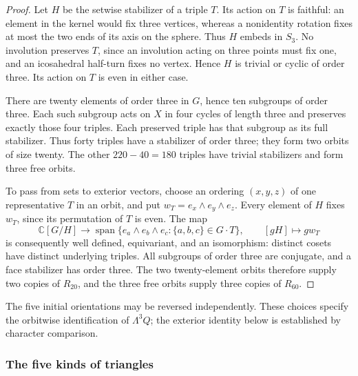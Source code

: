 \documentclass[11pt,a4paper]{article}
\begin{document}
\begin{proof}
Let $H$ be the setwise stabilizer of a triple $T$. Its action on $T$ is
faithful: an element in the kernel would fix three vertices, whereas
a nonidentity rotation fixes at most the two ends of its axis on the
sphere. Thus $H$ embeds in $S_3$. No involution preserves $T$, since
an involution acting on three points must fix one, and an icosahedral
half-turn fixes no vertex. Hence $H$ is trivial or cyclic of order
three. Its action on $T$ is even in either case.

There are twenty elements of order three in $G$, hence ten subgroups
of order three. Each such subgroup acts on $X$ in four cycles of
length three and preserves exactly those four triples. Each preserved
triple has that subgroup as its full stabilizer. Thus forty triples
have a stabilizer of order three; they form two orbits of size twenty.
The other $220-40=180$ triples have trivial stabilizers and form three
free orbits.

To pass from sets to exterior vectors, choose an ordering
$(x,y,z)$ of one representative $T$ in an orbit, and put
$w_T=e_x\wedge e_y\wedge e_z$. Every element of $H$ fixes $w_T$,
since its permutation of $T$ is even. The map
\[
\mathbb C[G/H]\longrightarrow
\operatorname{span}\{e_a\wedge e_b\wedge e_c:
                         \{a,b,c\}\in G\cdot T\},
\qquad [gH]\longmapsto g w_T
\]
is consequently well defined, equivariant, and an isomorphism: distinct
cosets have distinct underlying triples. All subgroups of order three
are conjugate, and a face stabilizer has order three. The two
twenty-element orbits therefore supply two copies of $R_{20}$, and
the three free orbits supply three copies of $R_{60}$.
\end{proof}

The five initial orientations may be reversed independently. These
choices specify the orbitwise identification of $\Lambda^3Q$; the
exterior identity below is established by character comparison.

\subsubsection*{The five kinds of triangles}
\end{document}
